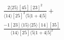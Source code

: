 \documentclass[varwidth, border=5pt]{standalone}
\begin{document}
\begin{my}
$\begin{gathered}
\scriptscriptstyle\frac{2⟨25⟩[45][23]^2}{⟨14⟩[25]^2⟨5|1+4|5]}+\\
\scriptscriptstyle\frac{-1[23]⟨15⟩⟨25⟩[14][35]}{⟨14⟩[25]⟨5|1+4|5]^2}\phantom{+}
\end{gathered}$
\end{my}
\end{document}
